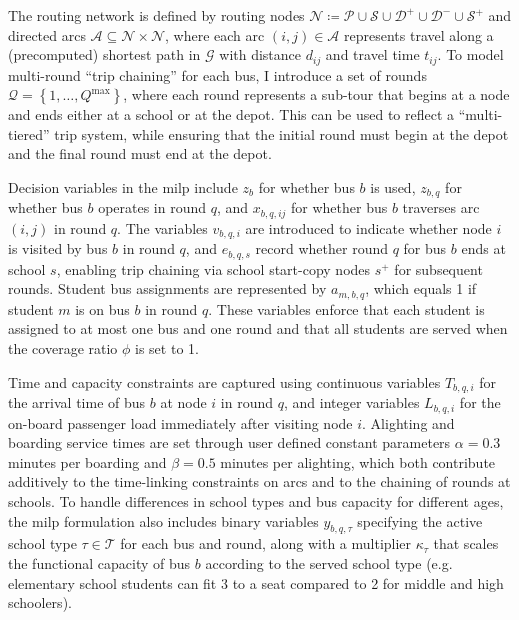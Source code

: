 The routing network is defined by routing nodes $\mathcal{N}\coloneq\mathcal{P}\cup\mathcal{S}\cup\mathcal{D}^{+}\cup\mathcal{D}^{-}\cup\mathcal{S}^{+}$ and directed arcs $\mathcal{A}\subseteq \mathcal{N}\times\mathcal{N}$, where each arc $\left(i,j\right)\in\mathcal{A}$ represents travel along a (precomputed) shortest path in $\mathcal{G}$ with distance $d_{ij}$ and travel time $t_{ij}$. To model multi-round ``trip chaining'' for each bus, I introduce a set of rounds $\mathcal{Q}=\left\{1,\ldots,Q^{\max}\right\}$, where each round represents a sub-tour that begins at a node and ends either at a school or at the depot. This can be used to reflect a ``multi-tiered'' trip system, while ensuring that the initial round must begin at the depot and the final round must end at the depot.

Decision variables in the \gls{milp} include $z_b$ for whether bus $b$ is used, $z_{b,q}$ for whether bus $b$ operates in round $q$, and $x_{b,q,ij}$ for whether bus $b$ traverses arc $\left(i,j\right)$ in round $q$. The variables $v_{b,q,i}$ are introduced to indicate whether node $i$ is visited by bus $b$ in round $q$, and $e_{b,q,s}$ record whether round $q$ for bus $b$ ends at school $s$, enabling trip chaining via school start-copy nodes $s^{+}$ for subsequent rounds. Student bus assignments are represented by $a_{m,b,q}$, which equals 1 if student $m$ is on bus $b$ in round $q$. These variables enforce that each student is assigned to at most one bus and one round and that all students are served when the coverage ratio $\phi$ is set to 1.

Time and capacity constraints are captured using continuous variables $T_{b,q,i}$ for the arrival time of bus $b$ at node $i$ in round $q$, and integer variables $L_{b,q,i}$ for the on-board passenger load immediately after visiting node $i$. Alighting and boarding service times are set through user defined constant parameters $\alpha=0.3$ minutes per boarding and $\beta=0.5$ minutes per alighting, which both contribute additively to the time-linking constraints on arcs and to the chaining of rounds at schools. To handle differences in school types and bus capacity for different ages, the \gls{milp} formulation also includes binary variables $y_{b,q,\tau}$ specifying the active school type $\tau\in\mathcal{T}$ for each bus and round, along with a multiplier $\kappa_\tau$ that scales the functional capacity of bus $b$ according to the served school type (e.g. elementary school students can fit 3 to a seat compared to 2 for middle and high schoolers).


